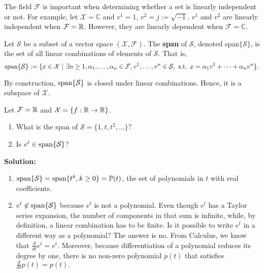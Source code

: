 \begin{rem}
The field $\mathcal{F}$ is important when determining whether a set is linearly independent or not. For example, let $\mathcal{X}=\mathbb{C}$ and $v^1=1$, $v^2=j:=\sqrt{-1}$. $v^1$ and $v^2$ are linearly independent when $\mathcal{F}=\mathbb R$. However, they are linearly dependent when $\mathcal{F}=\mathbb{C}$. 

\end{rem} 

\begin{definition}
 Let $\mathcal{S}$ be a subset of a vector space $(\mathcal{X},\mathcal{F})$. The \textbf{span} of $\mathcal{S}$, denoted span$\{\mathcal{S}\}$, is the set of all linear combinations of elements of $\mathcal{S}$. That is, 
  $$\mathrm{span} \{ \mathcal{S} \}:=\{ x\in\mathcal{X} ~| ~\exists n\geq 1, \alpha_1,\ldots , \alpha_n\in\mathcal{F}, v^1,\dots,v^n\in\mathcal{S}, \text{ s.t. } x=\alpha_1v^1+\dots+\alpha_nv^n\}.$$
  \end{definition}

\begin{rem}
By construction, $\mathrm{span} \{ \mathcal{S} \}$ is closed under linear combinations. Hence, it is a subspace of $\mathcal{X}$.

\end{rem} 

\begin{example}  Let $\mathcal{F}=\mathbb R$ and $\mathcal{X}=\{f: \mathbb R\rightarrow\mathbb R\}$. 
\begin{enumerate}
        \renewcommand{\labelenumi}{(\alph{enumi})}
        \setlength{\itemsep}{.1cm}
    \item What is the span of $\mathcal{S}=\{1,t,t^2,\dots\}$?
    \item Is $e^t \in \mathrm{span} \{ \mathcal{S} \}$?
    \end{enumerate}

\end{example}

\textbf{Solution:} 

\begin{enumerate}
        \renewcommand{\labelenumi}{(\alph{enumi})}
        \setlength{\itemsep}{.1cm}
    \item $\mathrm{span} \{ \mathcal{S} \}=\mathrm{span} \{ t^k, k\ge0  \} = \mathbb{P}(t)$, the set of polynomials in $t$ with real coefficients.
    \item $e^t \not \in \mathrm{span} \{ \mathcal{S} \}$ because $e^t$ is not a polynomial. Even though  $e^t$ has a Taylor series expansion, the number of components in that sum is infinite, while, by definition, a linear combination has to be finite. Is it possible to write $e^t$ in a different way as a polynomial? The answer is no. From Calculus, we know that $\frac{d}{dt} e^t = e ^t.$ Moreover, because differentiation of a polynomial reduces its degree by one, there is no non-zero polynomial $p(t)$ that satisfies $\frac{d}{dt} p(t) = p(t).$
    \end{enumerate}
\Qed

